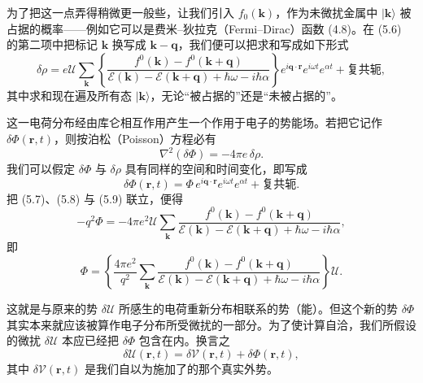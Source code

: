 为了把这一点弄得稍微更一般些，让我们引入 $f_{0}(\mathbf{k})$，作为未微扰金属中 $|\mathbf{k}\rangle$ 被占据的概率——例如它可以是费米--狄拉克（Fermi--Dirac）函数 (4.8)。在 (5.6) 的第二项中把标记 $\mathbf{k}$ 换写成 $\mathbf{k}-\mathbf{q}$，我们便可以把求和写成如下形式
\begin{equation*}
\delta\rho=e\mathcal{U}\sum_{\mathbf{k}}\left\{\frac{f^{0}(\mathbf{k})-f^{0}(\mathbf{k}+\mathbf{q})}{\mathcal{E}(\mathbf{k})-\mathcal{E}(\mathbf{k}+\mathbf{q})+\hbar\omega-i\hbar\alpha}\right\}e^{i\mathbf{q}\cdot\mathbf{r}}e^{i\omega t}e^{\alpha t}+\text{复共轭},
\tag{5.7}
\end{equation*}
其中求和现在遍及所有态 $|\mathbf{k}\rangle$，无论“被占据的”还是“未被占据的”。

这一电荷分布经由库仑相互作用产生一个作用于电子的势能场。若把它记作 $\delta\Phi(\mathbf{r},t)$，则按泊松（Poisson）方程必有
\begin{equation*}
\nabla^{2}(\delta\Phi)=-4\pi e\,\delta\rho.
\tag{5.8}
\end{equation*}
我们可以假定 $\delta\Phi$ 与 $\delta\rho$ 具有同样的空间和时间变化，即写成
\begin{equation*}
\delta\Phi(\mathbf{r},t)=\Phi\,e^{i\mathbf{q}\cdot\mathbf{r}}e^{i\omega t}e^{\alpha t}+\text{复共轭}.
\tag{5.9}
\end{equation*}
把 (5.7)、(5.8) 与 (5.9) 联立，便得
\begin{equation*}
-q^{2}\Phi=-4\pi e^{2}\mathcal{U}\sum_{\mathbf{k}}\frac{f^{0}(\mathbf{k})-f^{0}(\mathbf{k}+\mathbf{q})}{\mathcal{E}(\mathbf{k})-\mathcal{E}(\mathbf{k}+\mathbf{q})+\hbar\omega-i\hbar\alpha},
\tag{5.10}
\end{equation*}
即
\begin{equation*}
\Phi=\left\{\frac{4\pi e^{2}}{q^{2}}\sum_{\mathbf{k}}\frac{f^{0}(\mathbf{k})-f^{0}(\mathbf{k}+\mathbf{q})}{\mathcal{E}(\mathbf{k})-\mathcal{E}(\mathbf{k}+\mathbf{q})+\hbar\omega-i\hbar\alpha}\right\}\mathcal{U}.
\tag{5.11}
\end{equation*}

这就是与原来的势 $\delta\mathcal{U}$ 所感生的电荷重新分布相联系的势（能）。但这个新的势 $\delta\Phi$ 其实本来就应该被算作电子分布所受微扰的一部分。为了使计算自洽，我们所假设的微扰 $\delta\mathcal{U}$ 本应已经把 $\delta\Phi$ 包含在内。换言之
\begin{equation*}
\delta\mathcal{U}(\mathbf{r},t)=\delta\mathcal{V}(\mathbf{r},t)+\delta\Phi(\mathbf{r},t),
\tag{5.12}
\end{equation*}
其中 $\delta\mathcal{V}(\mathbf{r},t)$ 是我们自以为施加了的那个真实外势。

